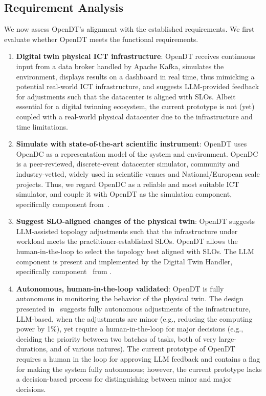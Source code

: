 \subsection{Requirement Analysis}\label{sec:design:requirements}
We now assess OpenDT's alignment with the established requirements. We first evaluate whether OpenDT meets the functional requirements.

\begin{enumerate}[label=\textbf{(FR\arabic*)},leftmargin=0pt,itemindent=3em]
    \item \label{design:fr1} \textbf{Digital twin physical ICT infrastructure}: 
    OpenDT receives continuous input from a data broker handled by Apache Kafka, simulates the environment, displays results on a dashboard in real time, thus mimicking a potential real-world ICT infrastructure, and suggests LLM-provided feedback for adjustments such that the datacenter is aligned with SLOs. Albeit essential for a digital twinning ecosystem, the current prototype is not (yet) coupled with a real-world physical datacenter due to the infrastructure and time limitations.
    \item \label{design:fr2} \textbf{Simulate with state-of-the-art scientific instrument}: 
    OpenDT uses OpenDC as a representation model of the system and environment. OpenDC is a peer-reviewed, discrete-event datacenter simulator, community and industry-vetted, widely used in scientific venues and National/European scale projects. Thus, we regard OpenDC as a reliable and most suitable ICT simulator, and couple it with OpenDT as the simulation component, specifically component  from~.
    \item \label{design:fr3} \textbf{Suggest SLO-aligned changes of the physical twin}: 
    OpenDT suggests LLM-assisted topology adjustments such that the infrastructure under workload meets the practitioner-established SLOs. OpenDT allows the human-in-the-loop to select the topology best aligned with SLOs. The LLM component is present and implemented by the Digital Twin Handler, specifically component~ from .
    \item \label{design:fr4} \textbf{Autonomous, human-in-the-loop validated}: 
    OpenDT is fully autonomous in monitoring the behavior of the physical twin. The design presented in~ suggests fully autonomous adjustments of the infrastructure, LLM-based, when the adjustments are minor (e.g., reducing the computing power by 1\%), yet require a human-in-the-loop for major decisions (e.g., deciding the priority between two batches of tasks, both of very large-durations, and of various natures). The current prototype of OpenDT requires a human in the loop for approving LLM feedback and contains a flag for making the system fully autonomous; however, the current prototype lacks a decision-based process for distinguishing between minor and major decisions.
\end{enumerate}

